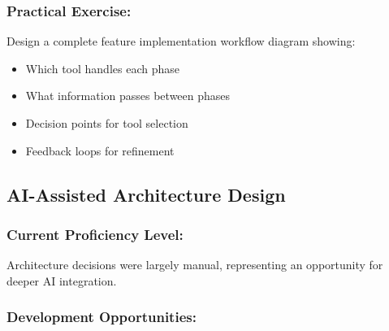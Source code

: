\documentclass[12pt,a4paper]{article}
\begin{document}
\subsubsection*{Practical Exercise:}

Design a complete feature implementation workflow diagram showing:
\begin{itemize}
    \item Which tool handles each phase
    \item What information passes between phases
    \item Decision points for tool selection
    \item Feedback loops for refinement
\end{itemize}

\subsection{AI-Assisted Architecture Design}

\subsubsection*{Current Proficiency Level:}
Architecture decisions were largely manual, representing an opportunity for deeper AI integration.

\subsubsection*{Development Opportunities:}
\end{document}
